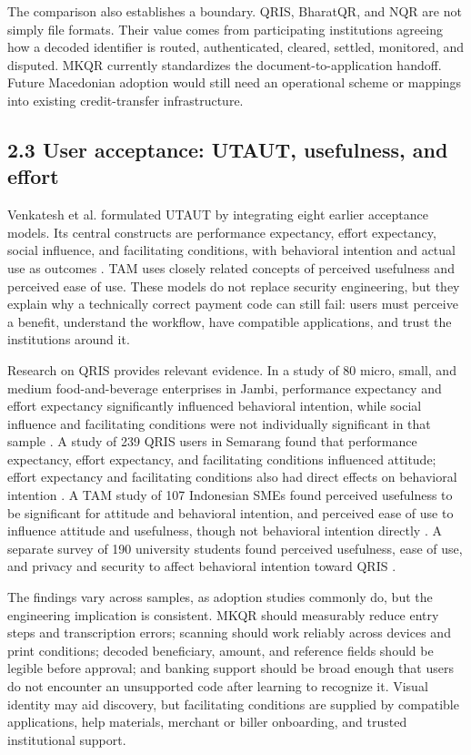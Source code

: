 The comparison also establishes a boundary. QRIS, BharatQR, and NQR are not simply file formats. Their value comes from participating institutions agreeing how a decoded identifier is routed, authenticated, cleared, settled, monitored, and disputed. MKQR currently standardizes the document-to-application handoff. Future Macedonian adoption would still need an operational scheme or mappings into existing credit-transfer infrastructure.

\subsection{2.3 User acceptance: UTAUT, usefulness, and effort}

Venkatesh et al. formulated UTAUT by integrating eight earlier acceptance models. Its central constructs are performance expectancy, effort expectancy, social influence, and facilitating conditions, with behavioral intention and actual use as outcomes \cite{venkatesh2003}. TAM uses closely related concepts of perceived usefulness and perceived ease of use. These models do not replace security engineering, but they explain why a technically correct payment code can still fail: users must perceive a benefit, understand the workflow, have compatible applications, and trust the institutions around it.

Research on QRIS provides relevant evidence. In a study of 80 micro, small, and medium food-and-beverage enterprises in Jambi, performance expectancy and effort expectancy significantly influenced behavioral intention, while social influence and facilitating conditions were not individually significant in that sample \cite{pangestu2022}. A study of 239 QRIS users in Semarang found that performance expectancy, effort expectancy, and facilitating conditions influenced attitude; effort expectancy and facilitating conditions also had direct effects on behavioral intention \cite{wibowo2023}. A TAM study of 107 Indonesian SMEs found perceived usefulness to be significant for attitude and behavioral intention, and perceived ease of use to influence attitude and usefulness, though not behavioral intention directly \cite{syah2022}. A separate survey of 190 university students found perceived usefulness, ease of use, and privacy and security to affect behavioral intention toward QRIS \cite{kurnia2024}.

The findings vary across samples, as adoption studies commonly do, but the engineering implication is consistent. MKQR should measurably reduce entry steps and transcription errors; scanning should work reliably across devices and print conditions; decoded beneficiary, amount, and reference fields should be legible before approval; and banking support should be broad enough that users do not encounter an unsupported code after learning to recognize it. Visual identity may aid discovery, but facilitating conditions are supplied by compatible applications, help materials, merchant or biller onboarding, and trusted institutional support.

